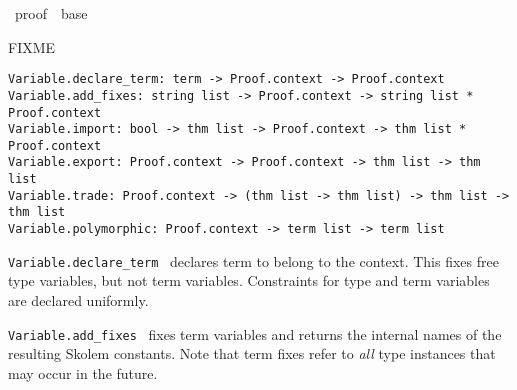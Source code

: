%
\begin{isabellebody}%
\def\isabellecontext{proof}%
%
\isadelimtheory
\isanewline
\isanewline
\isanewline
%
\endisadelimtheory
%
\isatagtheory
{}\isamarkupfalse%
\ {\isachardoublequoteopen}proof{\isachardoublequoteclose}\ \ base\ %
\endisatagtheory
{\isafoldtheory}%
%
\isadelimtheory
%
\endisadelimtheory
%
\isamarkuptrue%
%
\isamarkuptrue%
%
\isamarkuptrue%
%
\begin{isamarkuptext}%
FIXME%
\end{isamarkuptext}%
\isamarkuptrue%
%
\isadelimmlref
%
\endisadelimmlref
%
\isatagmlref
%
\begin{isamarkuptext}%
\begin{mldecls}
  \verb|Variable.declare_term: term -> Proof.context -> Proof.context| \\
  \verb|Variable.add_fixes: string list -> Proof.context -> string list * Proof.context| \\
  \verb|Variable.import: bool -> thm list -> Proof.context -> thm list * Proof.context| \\
  \verb|Variable.export: Proof.context -> Proof.context -> thm list -> thm list| \\
  \verb|Variable.trade: Proof.context -> (thm list -> thm list) -> thm list -> thm list| \\
  \verb|Variable.polymorphic: Proof.context -> term list -> term list| \\
  \end{mldecls}

  \begin{description}

  \item \verb|Variable.declare_term|~ declares term
   to belong to the context.  This fixes free type
  variables, but not term variables.  Constraints for type and term
  variables are declared uniformly.

  \item \verb|Variable.add_fixes|~ fixes term
  variables  and returns the internal names of the
  resulting Skolem constants.  Note that term fixes refer to
  \emph{all} type instances that may occur in the future.


\end{description}
\end{isamarkuptext}
\end{isabellebody}
